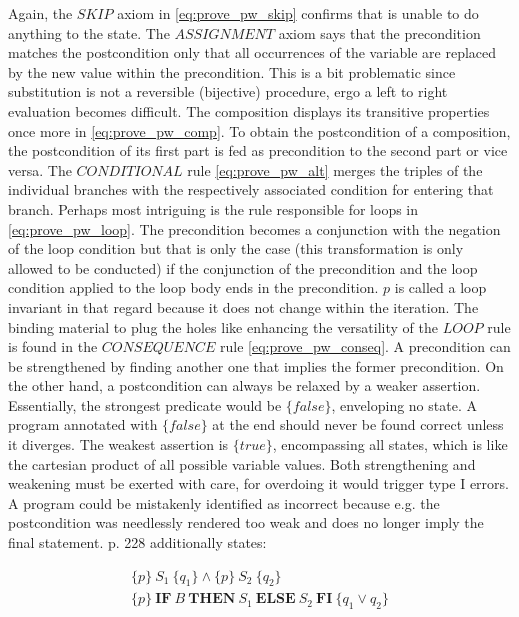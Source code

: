 Again, the $SKIP$ axiom in \eqref{eq:prove_pw_skip} confirms that  is unable to do anything to the state. The $ASSIGNMENT$ axiom says that the precondition matches the postcondition only that all occurrences of the variable are replaced by the new value within the precondition. This is a bit problematic since substitution is not a reversible (bijective) procedure, ergo a left to right evaluation becomes difficult. The composition displays its transitive properties once more in \eqref{eq:prove_pw_comp}. To obtain the postcondition of a composition, the postcondition of its first part is fed as precondition to the second part or vice versa. The $CONDITIONAL$ rule \eqref{eq:prove_pw_alt} merges the triples of the individual branches with the respectively associated condition for entering that branch. Perhaps most intriguing is the rule responsible for loops in \eqref{eq:prove_pw_loop}. The precondition becomes a conjunction with the negation of the loop condition but that is only the case (this transformation is only allowed to be conducted) if the conjunction of the precondition and the loop condition applied to the loop body ends in the precondition. $p$ is called a loop invariant in that regard because it does not change within the iteration. The binding material to plug the holes like enhancing the versatility of the $LOOP$ rule is found in the $CONSEQUENCE$ rule \eqref{eq:prove_pw_conseq}. A precondition can be strengthened by finding another one that implies the former precondition. On the other hand, a postcondition can always be relaxed by a weaker assertion. Essentially, the strongest predicate would be $\{false\}$, enveloping no state. A program annotated with $\{false\}$ at the end should never be found correct unless it diverges. The weakest assertion is $\{true\}$, encompassing all states, which is like the cartesian product of all possible variable values. Both strengthening and weakening must be exerted with care, for overdoing it would trigger type I  errors. A program could be mistakenly identified as incorrect because e.g. the postcondition was needlessly rendered too weak and does no longer imply the final statement. \cite{kleuker2009formale} p. 228 additionally states:

\begin{equation}
\begin{gathered}
	\{p\}\ S_1\ \{q_1\}\land \{p\}\ S_2\ \{q_2\} \\
	\hline
	\{p\}\ \mathbf{IF}\ B\ \mathbf{THEN}\ S_1\ \mathbf{ELSE}\ S_2\ \mathbf{FI}\ \{q_1\lor q_2\}
\end{gathered}
\end{equation}

